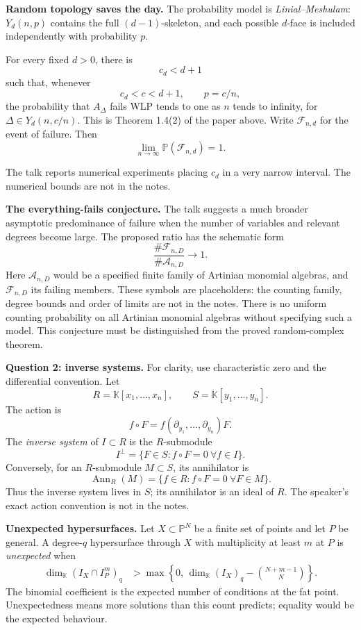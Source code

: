\medskip\noindent
\textbf{Random topology saves the day.}
The probability model is
\emph{Linial--Meshulam}:
$Y_d(n,p)$ contains the full
$(d-1)$-skeleton, and each possible
$d$-face is included independently
with probability $p$.

For every fixed $d>0$, there is
$$
c_d<d+1
$$
such that, whenever
$$
c_d<c<d+1,\qquad p=c/n,
$$
the probability that $A_\Delta$
fails WLP tends to one as $n$ tends
to infinity, for
$\Delta\in Y_d(n,c/n)$.
This is Theorem 1.4(2) of the paper above.
Write $\mathcal F_{n,d}$ for the event
of failure. Then
$$
\lim_{n\to\infty}
\mathbb P(\mathcal F_{n,d})=1.
$$

The talk reports numerical experiments
placing $c_d$ in a very narrow interval.
The numerical bounds are not in the notes.

\medskip\noindent
\textbf{The everything-fails conjecture.}
The talk suggests a much broader
asymptotic predominance of failure when
the number of variables and relevant
degrees become large.
The proposed ratio has the schematic
form
$$
\frac{\#\mathcal F_{n,D}}
{\#\mathcal A_{n,D}}
\longrightarrow1.
$$
Here $\mathcal A_{n,D}$ would be a
specified finite family of Artinian
monomial algebras, and
$\mathcal F_{n,D}$ its failing members.
These symbols are placeholders:
the counting family, degree bounds and
order of limits are not in the notes.
There is no uniform counting probability
on all Artinian monomial algebras
without specifying such a model.
This conjecture must be distinguished
from the proved random-complex theorem.

\medskip\noindent
\textbf{Question 2: inverse systems.}
For clarity, use characteristic zero
and the differential convention.
Let
$$
R=\mathbb K[x_1,\ldots,x_n],
\qquad S=\mathbb K[y_1,\ldots,y_n].
$$
The action is
$$
f\circ F=
f(\partial_{y_1},\ldots,\partial_{y_n})F.
$$
The \emph{inverse system} of $I\subset R$
is the $R$-submodule
$$
I^\perp=
\{F\in S:f\circ F=0
\ \forall f\in I\}.
$$
Conversely, for an $R$-submodule
$M\subset S$, its annihilator is
$$
\operatorname{Ann}_R(M)=
\{f\in R:f\circ F=0
\ \forall F\in M\}.
$$
Thus the inverse system lives in $S$;
its annihilator is an ideal of $R$.
The speaker's exact action convention
is not in the notes.

\medskip\noindent
\textbf{Unexpected hypersurfaces.}
Let $X\subset\mathbb P^N$ be a finite
set of points and let $P$ be general.
A degree-$q$ hypersurface through $X$
with multiplicity at least $m$ at $P$
is \emph{unexpected} when
$$
\begin{aligned}
\dim_{\mathbb K}(I_X\cap I_P^m)_q
&>\max\left\{0,\,
\dim_{\mathbb K}(I_X)_q
-\binom{N+m-1}{N}\right\}.
\end{aligned}
$$
The binomial coefficient is the expected
number of conditions at the fat point.
Unexpectedness means more solutions
than this count predicts; equality
would be the expected behaviour.

